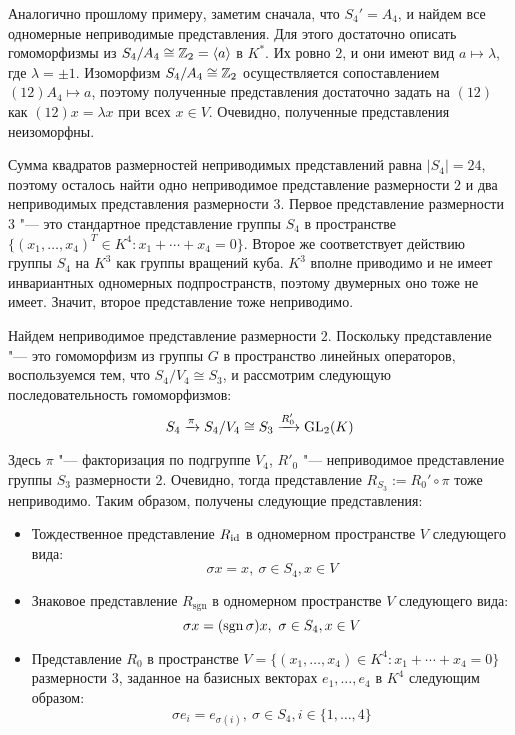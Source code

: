 \begin{solution}
	 Аналогично прошлому примеру, заметим сначала, что $S_4' = A_4$, и найдем все одномерные неприводимые представления. Для этого достаточно описать гомоморфизмы из $S_4 / A_4 \cong \mathbb{Z}_2 = \langle a \rangle$ в $K^*$. Их ровно $2$, и они имеют вид $a \mapsto \lambda$, где $\lambda = \pm 1$. Изоморфизм $S_4 / A_4 \cong \mathbb{Z}_2$ осуществляется сопоставлением $(12)A_4 \mapsto a$, поэтому полученные представления достаточно задать на $(12)$ как $(12) x = \lambda x$ при всех $x \in V$. Очевидно, полученные представления неизоморфны.
	
	Сумма квадратов размерностей неприводимых представлений равна $|S_4| = 24$, поэтому осталось найти одно неприводимое представление размерности $2$ и два неприводимых представления размерности $3$. Первое представление размерности $3$ "--- это стандартное представление группы $S_4$ в пространстве $\{(x_1, \dotsc, x_4)^T \in K^4 : x_1 + \dotsb + x_4 = 0\}$. Второе же соответствует действию группы $S_4$ на $K^3$ как группы вращений куба. $K^3$ вполне приводимо и не имеет инвариантных одномерных подпространств, поэтому двумерных оно тоже не имеет. Значит, второе представление тоже неприводимо.
	
	Найдем неприводимое представление размерности $2$. Поскольку представление "--- это гомоморфизм из группы $G$ в пространство линейных операторов, воспользуемся тем, что $S_4 / V_4 \cong S_3$, и рассмотрим следующую последовательность гомоморфизмов:
	\[S_4 \xrightarrow{\pi} S_4 / V_4 \cong S_3 \xrightarrow{R'_0} \operatorname{GL}_2(K)\]
	
	Здесь $\pi$ "--- факторизация по подгруппе $V_4$, $R'_0$ "--- неприводимое представление группы $S_3$ размерности $2$. Очевидно, тогда представление $R_{S_3} := R_0' \circ \pi$ тоже неприводимо. Таким образом, получены следующие представления:
	\begin{itemize}
		\item Тождественное представление $R_{\mathrm{id}}$ в одномерном пространстве $V$ следующего вида:
		\[\sigma x = x,~\sigma \in S_4, x \in V\]
		
		\item Знаковое представление $R_{\mathrm{sgn}}$ в одномерном пространстве $V$ следующего вида:
		\[\sigma x = (\operatorname{sgn}\sigma)x,~\sigma \in S_4, x \in V\]
		
		\item Представление $R_0$ в пространстве $V = \{(x_1, \dotsc, x_4) \in K^4 : x_1 + \dotsb + x_4 = 0\}$ размерности $3$, заданное на базисных векторах $e_1, \dotsc, e_4$ в $K^4$ следующим образом:
		\[\sigma e_i = e_{\sigma(i)},~\sigma \in S_4, i \in \{1, \dotsc, 4\}\]
		

\end{itemize}
\end{solution}

